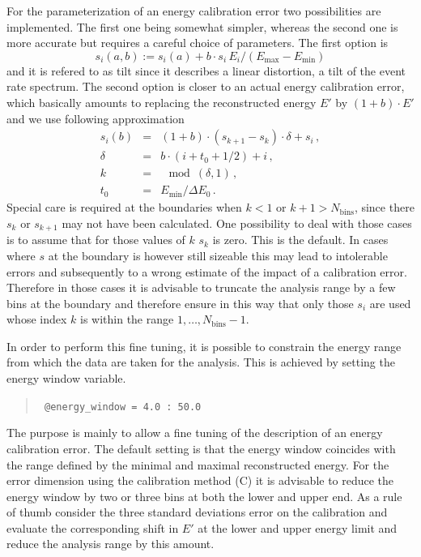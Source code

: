 For the parameterization of an energy calibration error two possibilities
are implemented. The first one being somewhat simpler, whereas the second one
is more accurate but requires a careful choice of parameters. The first 
option is
\begin{equation}
s_i(a,b):=s_i(a)+b\cdot s_i\, E_i/(E_\mathrm{max}-E_\mathrm{min})
\end{equation}
and it is refered to as tilt since it describes a linear distortion, a tilt
of the event rate spectrum. The second option is closer to an actual energy
calibration error, which basically amounts to replacing the reconstructed 
energy $E'$ by $(1+b)\cdot E'$ and we use following approximation
\begin{eqnarray}
s_i(b)&=& (1+b)\cdot(s_{k+1}-s_k)\cdot\delta+s_i\,,\\
\delta&=&b\cdot(i+t_0+ 1/2)+i\,,\nonumber\\
k&=&\mod(\delta,1)\,,\nonumber\\
t_0&=&E_\mathrm{min}/\Delta E_0\,.\nonumber
\end{eqnarray}
Special care is required at the boundaries when $k<1$ or $k+1>N_\mathrm{bins}$,
since there $s_k$ or $s_{k+1}$ may not have been calculated. One possibility
to deal with those cases is to assume that for those values of $k$ $s_k$ is
zero. This is the default. In cases where $s$ at the boundary is however still
sizeable this may lead to intolerable errors and subsequently to a wrong
estimate of the impact of a calibration error. Therefore in those cases it
is advisable to truncate the analysis range by a few bins at the boundary
and therefore ensure in this way that only those $s_i$ are used whose index
$k$ is within the range $1,\ldots, N_\mathrm{bins}-1$. 

In order to perform this fine tuning, it is possible to constrain 
the energy range from which the data are taken for the 
analysis. This is achieved by setting the energy window
variable. 
\begin{quote}
{\tt 
\tb @energy\_window = 4.0 : 50.0 
}
\end{quote}
The purpose is mainly to allow a fine tuning of the description
of an energy calibration error. The default setting is that the energy window
coincides with the range defined by the minimal and maximal reconstructed 
energy. For the error dimension using the calibration method (C) it is 
advisable to reduce the energy window by two or three bins at both the lower
and upper end. As a rule of
thumb consider the three standard deviations error on the calibration and
evaluate the corresponding shift in $E'$ at the lower and upper energy limit 
and reduce the analysis range by this amount.

